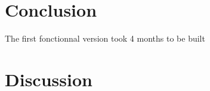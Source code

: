 \section{Conclusion} %
The first fonctionnal version took 4 months to be built


\section{Discussion} %






%










